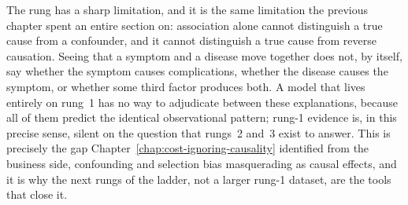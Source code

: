 The rung has a sharp limitation, and it is the same limitation the previous chapter spent an entire section on: association alone cannot distinguish a true cause from a confounder, and it cannot distinguish a true cause from reverse causation. Seeing that a symptom and a disease move together does not, by itself, say whether the symptom causes complications, whether the disease causes the symptom, or whether some third factor produces both. A model that lives entirely on rung~1 has no way to adjudicate between these explanations, because all of them predict the identical observational pattern; rung-1 evidence is, in this precise sense, silent on the question that rungs~2 and~3 exist to answer. This is precisely the gap Chapter~\ref{chap:cost-ignoring-causality} identified from the business side, confounding and selection bias masquerading as causal effects, and it is why the next rungs of the ladder, not a larger rung-1 dataset, are the tools that close it.
